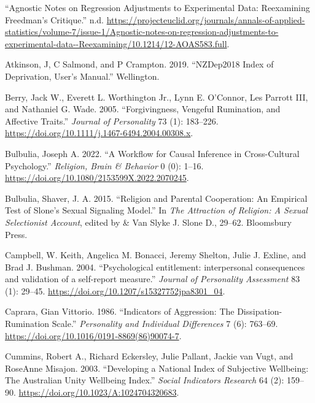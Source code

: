 \documentclass[
  singlecolumn]{report}
\newlength{\cslhangindent}
\newlength{\cslentryspacingunit} %
\newenvironment{CSLReferences}[2] %
 {%
  \setlength{\parindent}{0pt}
  \ifodd #1
  \let\oldpar\par
  \def\par{\hangindent=\cslhangindent\oldpar}
  \fi
  \setlength{\parskip}{#2\cslentryspacingunit}
 }%
 {}
\begin{document}
\hypertarget{refs}{}
\begin{CSLReferences}{1}{0}
\leavevmode{}%
{``Agnostic Notes on Regression Adjustments to Experimental Data:
Reexamining Freedman{'}s Critique.''} n.d.
\url{https://projecteuclid.org/journals/annals-of-applied-statistics/volume-7/issue-1/Agnostic-notes-on-regression-adjustments-to-experimental-data--Reexamining/10.1214/12-AOAS583.full}.

\leavevmode{}%
Atkinson, J, C Salmond, and P Crampton. 2019. {``NZDep2018 Index of
Deprivation, User{'}s Manual.''} Wellington.

\leavevmode{}%
Berry, Jack W., Everett L. Worthington Jr., Lynn E. O'Connor, Les
Parrott III, and Nathaniel G. Wade. 2005. {``Forgivingness, Vengeful
Rumination, and Affective Traits.''} \emph{Journal of Personality} 73
(1): 183--226. \url{https://doi.org/10.1111/j.1467-6494.2004.00308.x}.

\leavevmode{}%
Bulbulia, Joseph A. 2022. {``A Workflow for Causal Inference in
Cross-Cultural Psychology.''} \emph{Religion, Brain \& Behavior} 0 (0):
1--16. \url{https://doi.org/10.1080/2153599X.2022.2070245}.

\leavevmode{}%
Bulbulia, Shaver, J. A. 2015. {``Religion and Parental Cooperation: An
Empirical Test of Slone's Sexual Signaling Model.''} In \emph{The
Attraction of Religion: A Sexual Selectionist Account}, edited by \& Van
Slyke J. Slone D., 29--62. Bloomsbury Press.

\leavevmode{}%
Campbell, W. Keith, Angelica M. Bonacci, Jeremy Shelton, Julie J.
Exline, and Brad J. Bushman. 2004. {``Psychological entitlement:
interpersonal consequences and validation of a self-report measure.''}
\emph{Journal of Personality Assessment} 83 (1): 29--45.
\url{https://doi.org/10.1207/s15327752jpa8301_04}.

\leavevmode{}%
Caprara, Gian Vittorio. 1986. {``Indicators of Aggression: The
Dissipation-Rumination Scale.''} \emph{Personality and Individual
Differences} 7 (6): 763--69.
\url{https://doi.org/10.1016/0191-8869(86)90074-7}.

\leavevmode{}%
Cummins, Robert A., Richard Eckersley, Julie Pallant, Jackie van Vugt,
and RoseAnne Misajon. 2003. {``Developing a National Index of Subjective
Wellbeing: The Australian Unity Wellbeing Index.''} \emph{Social
Indicators Research} 64 (2): 159--90.
\url{https://doi.org/10.1023/A:1024704320683}.


\end{CSLReferences}
\end{document}
